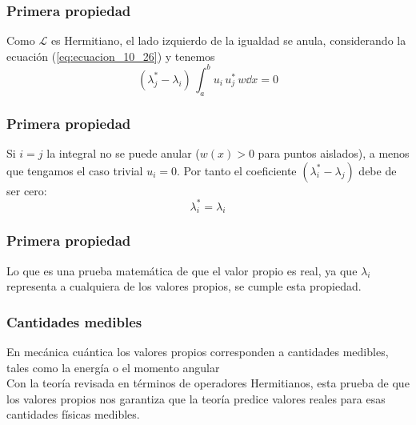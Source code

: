 \begin{frame}
\frametitle{Primera propiedad}
Como $\mathcal{L}$ es Hermitiano, el lado izquierdo de la igualdad se anula, considerando la ecuación (\ref{eq:ecuacion_10_26}) y tenemos
\begin{equation}
(\lambda_{j}^{*} - \lambda_{i}) \, \int_{a}^{b}  u_{i} \, u_{j}^{*} \, w \dd{x} = 0
\label{eq:ecuacion_10_34}
\end{equation}
\end{frame}
\begin{frame}
\frametitle{Primera propiedad}
Si $i=j$ la integral no se puede anular ($w(x) > 0$ para puntos aislados), a menos que tengamos el caso trivial $u_{i} = 0$. Por tanto el coeficiente $(\lambda_{i}^{*} - \lambda_{j})$ debe de ser cero:
\begin{equation}
\lambda_{i}^{*} = \lambda_{i}
\label{eq:ecuacion_10_35}
\end{equation}
\end{frame}
\begin{frame}
\frametitle{Primera propiedad}
Lo que es una prueba matemática de que el valor propio es real, ya que $\lambda_{i}$ representa a cualquiera de los valores propios, se cumple esta propiedad.
\end{frame}
\begin{frame}
\frametitle{Cantidades medibles}
En mecánica cuántica los valores propios corresponden a cantidades medibles, tales como la energía o el momento angular
\\
\bigskip
Con la teoría revisada en términos de operadores Hermitianos, esta prueba de que los valores propios nos garantiza que la teoría predice valores reales para esas cantidades físicas medibles.
\end{frame}
